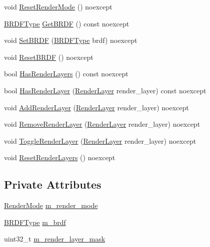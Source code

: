\begin{DoxyCompactItemize}
\item 
void \hyperlink{structmage_1_1_camera_settings_aa8facc0ddcd3e3d9f3c05c9f44c77b5d}{Reset\+Render\+Mode} () noexcept
\item 
\hyperlink{namespacemage_ae7a7a03a7b34d7e2689689bb8295cd38}{B\+R\+D\+F\+Type} \hyperlink{structmage_1_1_camera_settings_a31504f7e9b23404ee1b200561b8dd789}{Get\+B\+R\+DF} () const noexcept
\item 
void \hyperlink{structmage_1_1_camera_settings_a8fbc3d6013d5f711decaf6f7348f2e15}{Set\+B\+R\+DF} (\hyperlink{namespacemage_ae7a7a03a7b34d7e2689689bb8295cd38}{B\+R\+D\+F\+Type} brdf) noexcept
\item 
void \hyperlink{structmage_1_1_camera_settings_a1f8b3952282d153db4fb6416e9d933b7}{Reset\+B\+R\+DF} () noexcept
\item 
bool \hyperlink{structmage_1_1_camera_settings_a838dfb8f3d32d3d23a7c72719ce182f3}{Has\+Render\+Layers} () const noexcept
\item 
bool \hyperlink{structmage_1_1_camera_settings_a5f5f7e1019db2e65cddc1a62ae30efc7}{Has\+Render\+Layer} (\hyperlink{namespacemage_a8b4a82582105b0299e2c2be5af7255d6}{Render\+Layer} render\+\_\+layer) const noexcept
\item 
void \hyperlink{structmage_1_1_camera_settings_ab1dca8b8f52daf55614592e0bb640ae9}{Add\+Render\+Layer} (\hyperlink{namespacemage_a8b4a82582105b0299e2c2be5af7255d6}{Render\+Layer} render\+\_\+layer) noexcept
\item 
void \hyperlink{structmage_1_1_camera_settings_a358ab9da30af67ca8b1ea2a5eb5a2710}{Remove\+Render\+Layer} (\hyperlink{namespacemage_a8b4a82582105b0299e2c2be5af7255d6}{Render\+Layer} render\+\_\+layer) noexcept
\item 
void \hyperlink{structmage_1_1_camera_settings_a47c34af7eddc2a0f6256d137b5813a4c}{Toggle\+Render\+Layer} (\hyperlink{namespacemage_a8b4a82582105b0299e2c2be5af7255d6}{Render\+Layer} render\+\_\+layer) noexcept
\item 
void \hyperlink{structmage_1_1_camera_settings_afc9bcdb1f27adfb1c69a668a24113b46}{Reset\+Render\+Layers} () noexcept
\end{DoxyCompactItemize}
\subsection*{Private Attributes}
\begin{DoxyCompactItemize}
\item 
\hyperlink{namespacemage_a5e7e18b0154373ce8fc942fe3f6b27fd}{Render\+Mode} \hyperlink{structmage_1_1_camera_settings_aa4d5139b4e8668c58507ead30812c84b}{m\+\_\+render\+\_\+mode}
\item 
\hyperlink{namespacemage_ae7a7a03a7b34d7e2689689bb8295cd38}{B\+R\+D\+F\+Type} \hyperlink{structmage_1_1_camera_settings_ac6a51ea7c770af79de4f97b53cab83b7}{m\+\_\+brdf}
\item 
uint32\+\_\+t \hyperlink{structmage_1_1_camera_settings_a21fd14ff3b589a79b1c69b05fbee05cf}{m\+\_\+render\+\_\+layer\+\_\+mask}
\end{DoxyCompactItemize}


